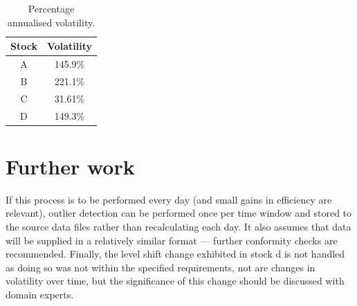 \documentclass[12pt]{article}
\begin{document}
\begin{table}[ht]
    \centering
    \begin{tabular}{|c|c|}
        \hline
        Stock & Volatility \\
        \hline
        A & 145.9\% \\
        B & 221.1\% \\
        C & 31.61\% \\
        D & 149.3\% \\
        \hline
    \end{tabular}
    \caption{Percentage annualised volatility.}\label{tab:vol}
\end{table}

\section{Further work}
If this process is to be performed every day (and small gains in efficiency are relevant), outlier detection can be performed once per time window and stored to the source data files rather than recalculating each day. It also assumes that data will be supplied in a relatively similar format --- further conformity checks are recommended. Finally, the level shift change exhibited in stock d is not handled as doing so was not within the specified requirements, not are changes in volatility over time, but the significance of this change should be discussed with domain experts.




\end{document}
